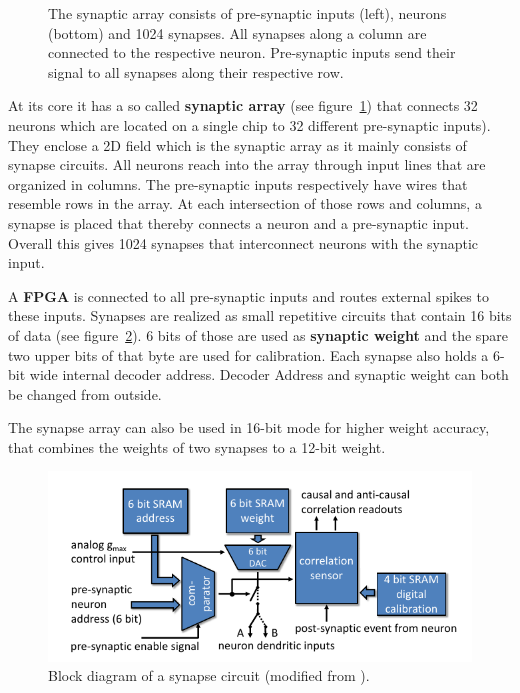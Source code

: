 \begin{figure}[h!]
    \centering
    
    \caption{\label{fig:array} The synaptic array consists of pre-synaptic inputs (left), neurons (bottom) and 1024 synapses. All synapses along a column are connected to the respective neuron. Pre-synaptic inputs send their signal to all synapses along their respective row.}
\end{figure}
At its core it has a so called \textbf{synaptic array} (see figure~\ref{fig:array}) that connects 32 neurons which are located on a single chip to 32 different pre-synaptic inputs).
They enclose a 2D field which is the synaptic array as it mainly consists of synapse circuits.
All neurons reach into the array through input lines that are organized in columns.
The pre-synaptic inputs respectively have wires that resemble rows in the array.
At each intersection of those rows and columns, a synapse is placed that thereby connects a neuron and a pre-synaptic input.
Overall this gives 1024 synapses that interconnect neurons with the synaptic input.

A \textbf{\ac{FPGA}} is connected to all pre-synaptic inputs and routes external spikes to these inputs.
Synapses are realized as small repetitive circuits that contain 16 bits of data (see figure~\ref{fig:circuit}).
6 bits of those are used as \textbf{synaptic weight} and the spare two upper bits of that byte are used for calibration.
Each synapse also holds a 6-bit wide internal decoder address.
Decoder Address and synaptic weight can both be changed from outside.

The synapse array can also be used in 16-bit mode for higher weight accuracy, that combines the weights of two synapses to a 12-bit weight.
\begin{figure}[htbp]
    \centering
    \includegraphics[width=\textwidth]{pictures/syncircuit.png}
    \caption{\label{fig:circuit} Block diagram of a synapse circuit (modified from \citeauthor{PPU}).}
\end{figure}

